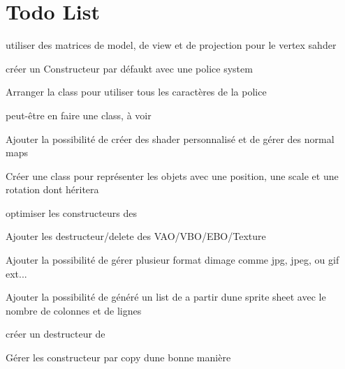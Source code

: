 \chapter{Todo List}
\hypertarget{todo}{}\label{todo}

\begin{DoxyRefList}
\item[Member \doxylink{shaders_8cpp_aa4e3821fb3d25cef0fcd8bd89a1666e8}{default\+Fragment} ]\label{todo__todo000005}%
%
utiliser des matrices de model, de view et de projection pour le vertex sahder  
\item[Class \doxylink{classFont}{Font} ]\label{todo__todo000002}%
%
créer un Constructeur par défaukt avec une police system  
\item[Member \doxylink{classFont_a41a7dca42ac0df85a27163dc9ace9de3}{Font\+::Font} (int glyph\+Size, const char \texorpdfstring{$\ast$}{*}ttf\+Path)]\label{todo__todo000003}%
%
Arranger la class pour utiliser tous les caractères de la police  
\item[Struct \doxylink{structImage}{Image} ]\label{todo__todo000007}%
%
peut-\/être en faire une class, à voir  
\item[Class \doxylink{classScene}{Scene} ]\label{todo__todo000004}%
%
Ajouter la possibilité de créer des shader personnalisé et de gérer des normal maps  
\item[Class \doxylink{classShape}{Shape} ]\label{todo__todo000006}%
%
Créer une class pour représenter les objets avec une position, une scale et une rotation dont  héritera 



optimiser les constructeurs des  



Ajouter les destructeur/delete des VAO/\+VBO/\+EBO/\+Texture  
\item[Class \doxylink{classTexture}{Texture} ]\label{todo__todo000008}%
%
Ajouter la possibilité de gérer plusieur format d\textquotesingle{}image comme jpg, jpeg, ou gif ext... 



Ajouter la possibilité de généré un list de  a partir d\textquotesingle{}une sprite sheet avec le nombre de colonnes et de lignes 



créer un destructeur de   
\item[Class \doxylink{classVector2}{Vector2\texorpdfstring{$<$}{<} T \texorpdfstring{$>$}{>}} ]\label{todo__todo000001}%
%
Gérer les constructeur par copy d\textquotesingle{}une bonne manière 
\end{DoxyRefList}